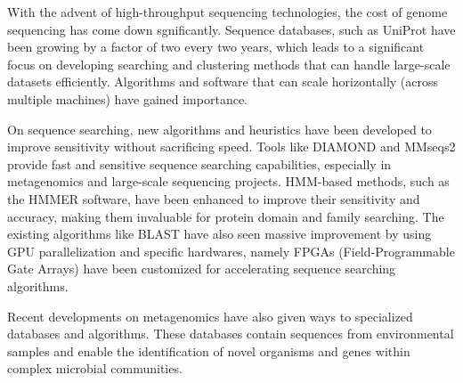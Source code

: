 With the advent of high-throughput sequencing technologies, the cost of genome sequencing has come down sgnificantly. Sequence databases, such as UniProt have been growing by a factor of two every two years, which leads to a significant focus on developing searching and clustering methods that can handle large-scale datasets efficiently. Algorithms and software that can scale horizontally (across multiple machines) have gained importance.

On sequence searching, new algorithms and heuristics have been developed to improve sensitivity without sacrificing speed. Tools like DIAMOND and MMseqs2 provide fast and sensitive sequence searching capabilities, especially in metagenomics and large-scale sequencing projects. HMM-based methods, such as the HMMER software, have been enhanced to improve their sensitivity and accuracy, making them invaluable for protein domain and family searching. The existing algorithms like BLAST have also seen massive improvement by using GPU parallelization and specific hardwares, namely FPGAs (Field-Programmable Gate Arrays) have been customized for accelerating sequence searching algorithms.

Recent developments on metagenomics have also given ways to specialized databases and algorithms. These databases contain sequences from environmental samples and enable the identification of novel organisms and genes within complex microbial communities.

